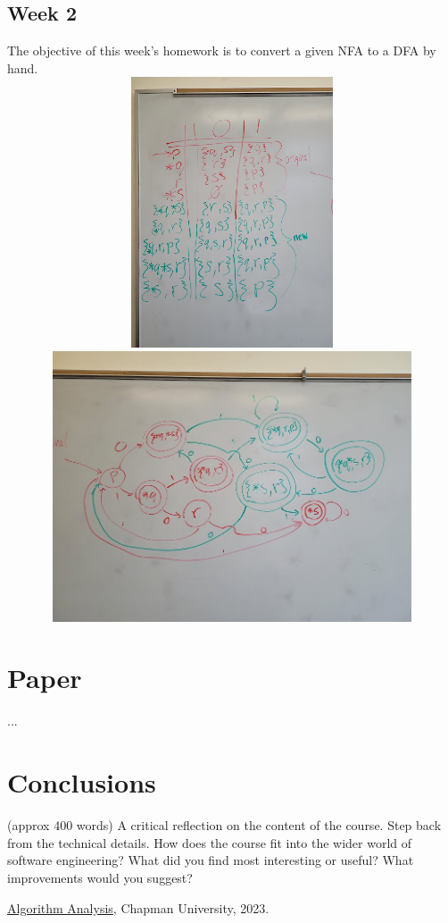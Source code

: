 \documentclass{article}
\theoremstyle{theorem}
\theoremstyle{definition}
\theoremstyle{remark}
\begin{document}
\subsection{Week 2}
The objective of this week's homework is to convert a given NFA to a DFA by hand.
\\ \includegraphics[width=15cm, height=8cm]{Report Images/HW3_1.jpg}
\\ \includegraphics[width=15cm, height=8cm]{Report Images/HW3_2.jpg}

\section{Paper}

...

\section{Conclusions}\label{conclusions}

(approx 400 words) A critical reflection on the content of the course. Step back from the technical details. How does the course fit into the wider world of software engineering? What did you find most interesting or useful? What improvements would you suggest?

\begin{thebibliography}{99}
 \href{https://github.com/alexhkurz/algorithm-analysis-2023}{Algorithm Analysis}, Chapman University, 2023.
\end{thebibliography}
\end{document}
